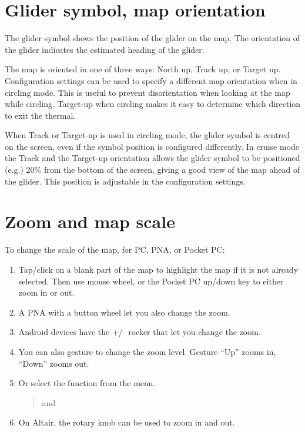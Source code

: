\section{Glider symbol, map orientation}
The glider symbol shows the position of the glider on the map.  The
orientation of the glider indicates the estimated heading of the
glider.

The map is oriented in one of three ways: North up,
Track up, or Target up.  Configuration settings  can be used
to specify a different map orientation when in circling mode. This is useful to prevent
disorientation when looking at the map while circling.  Target-up when
circling makes it easy to determine which direction to exit the
thermal.

When Track or Target-up is used in circling mode, the glider symbol is
centred on the screen, even if the symbol position is configured differently.
In cruise mode the Track and the Target-up orientation allows the glider
symbol to be positioned (e.g.) 20\% from the bottom of the screen, giving a good view of the
map ahead of the glider.  This position is adjustable in the configuration
 settings.

\section{Zoom and map scale}\label{sec:zooming}

To change the scale of the map, for PC, PNA, or Pocket PC:
\begin{enumerate}
\item Tap/click on a blank part of the map to highlight the map if it is not
already selected.
Then use mouse wheel, or the Pocket PC up/down key to either zoom
in or out.
\item A PNA with a button wheel let you also change the zoom. 
\item Android devices have the +/- rocker that let you change the zoom. 
\item You can also gesture to change the zoom level. Gesture 
``Up'' zooms in, ``Down'' zooms out.
\item Or select the function from the menu.
\begin{quote}
\blink{} and 
\end{quote}
\item On Altair, the rotary knob can be used to zoom in and out.
\end{enumerate}

